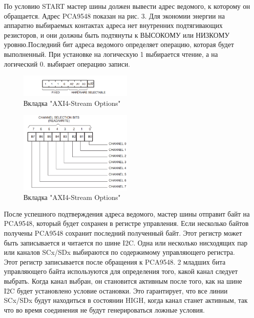 \documentclass[a4paper,oneside ,14pt]{extreport}
\begin{document}
По условию START мастер шины должен вывести адрес ведомого, к которому он обращается. Адрес PCA9548 показан на рис. 3. Для экономии энергии на аппаратно выбираемых контактах адреса нет внутренних подтягивающих резисторов, и они должны быть подтянуты к ВЫСОКОМУ или НИЗКОМУ уровню.Последний бит адреса ведомого определяет операцию, которая будет выполненный. При установке на логическую 1 выбирается чтение, а на логический 0.
выбирает операцию записи.

\begin{figure}[h]
	\centering
	\includegraphics[width=0.5\textwidth]{image/PCA9548_addr.png}
	\caption{Вкладка "AXI4-Stream Options"}
	\label{PCA9548_addr.PNG}
\end{figure}

\begin{figure}[h]
	\centering
	\includegraphics[width=0.5\textwidth]{image/PCA9548_CR.png}
	\caption{Вкладка "AXI4-Stream Options"}
	\label{PCA9548_CR.PNG}
\end{figure}

После успешного подтверждения адреса ведомого,
мастер шины отправит байт на PCA9548, который будет сохранен
в регистре управления. Если несколько байтов получены
PCA9548 сохранит последний полученный байт. Этот регистр может быть
записывается и читается по шине I2C.
Одна или несколько нисходящих пар или каналов SCx/SDx выбираются по содержимому управляющего регистра. Этот регистр записывается после обращения к PCA9548. 2 младших бита управляющего байта используются для определения того, какой канал следует выбрать. Когда канал выбран, он становится активным после того, как на шине I2C будет установлено условие остановки. Это гарантирует, что все линии SCx/SDx будут находиться в состоянии HIGH, когда канал станет активным, так что во время соединения не будут генерироваться ложные условия.
\end{document}
